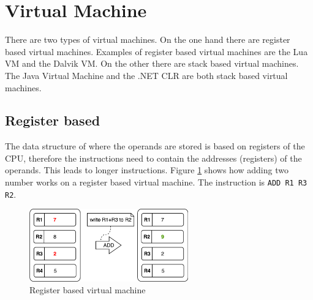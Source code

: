 \section{Virtual Machine}
There are two types of virtual machines. On the one hand there are register based virtual machines. Examples of register based virtual machines are the Lua VM and the Dalvik VM. On the other there are stack based virtual machines. The Java Virtual Machine and the .NET CLR are both stack based virtual machines. \cite{stackvsregistervm}

\subsection{Register based}
The data structure of where the operands are stored is based on registers of the CPU, therefore the instructions need to contain the addresses (registers) of the operands. This leads to longer instructions. Figure \ref{register vm} shows how adding two number works on a register based virtual machine. \cite{stackvsregistervm} The instruction is \texttt{ADD R1 R3 R2}.

\begin{figure}[H]
	\begin{center}
	\includegraphics[width=0.61\textwidth]{./images/register-example}
	\caption{Register based virtual machine}
	\label{register vm}
	\end{center}
\end{figure}
  
